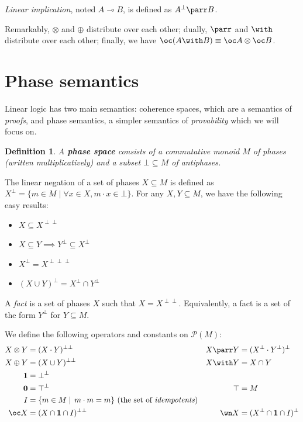 \documentclass[11pt]{article}
\newtheorem{definition}{Definition}[section]
\newcommand\0{\textbf{0}}
\newcommand\1{\textbf{1}}
\newcommand\biperp{{\perp\perp}}
\newcommand\triperp{{\perp\perp\perp}}
\begin{document}
\emph{Linear implication}, noted $A \multimap B$, is defined as $A^\perp \parr B$.

Remarkably, $\otimes$ and $\oplus$ distribute over each other; dually,
$\parr$ and $\with$ distribute over each other; finally, we have $\oc (A \with B) \equiv \oc A \otimes \oc B$.

\section{\label{sec:phase_semantics}Phase semantics}

Linear logic has two main semantics: coherence spaces, which are a semantics of \emph{proofs}, and phase semantics,
a simpler semantics of \emph{provability} which we will focus on.

\begin{definition}
    A \textbf{phase space} consists of a commutative monoid $M$ of \emph{phases} (written multiplicatively)
    and a subset $\bot \subseteq M$ of \emph{antiphases}.
\end{definition}

The linear negation of a set of phases $X \subseteq M$ is defined as $X^\perp = \{m \in M \mid \forall x \in X, m \cdot x \in \bot\}$.
For any $X, Y \subseteq M$, we have the following easy results:
\begin{itemize}
    \item $X \subseteq X^\biperp$
    \item $X \subseteq Y \implies Y^\perp \subseteq X^\perp$
    \item $X^\perp = X^\triperp$
    \item $(X \cup Y)^\perp = X^\perp \cap Y^\perp$
\end{itemize}
A \emph{fact} is a set of phases $X$ such that $X = X^\biperp$. Equivalently, a fact is a set of the form $Y^\perp$
for $Y \subseteq M$.

We define the following operators and constants on $\mathcal P(M)$:
\begin{align*}
    X \otimes Y &= (X \cdot Y)^\biperp & X \parr Y &= (X^\perp \cdot Y^\perp)^\perp \\
    X \oplus Y &= (X \cup Y)^\biperp & X \with Y &= X \cap Y \\
    \1 &= \bot^\perp \\
    \0 &= \top^\perp & \top &= M \\
    I &= \{m \in M \mid\, m\cdot m = m\}\text{ (the set of \textit{idempotents})} \\
    \oc X &= (X \cap \1 \cap I)^\biperp & \wn X &= (X^\perp \cap \1 \cap I)^\perp
\end{align*}
\end{document}

